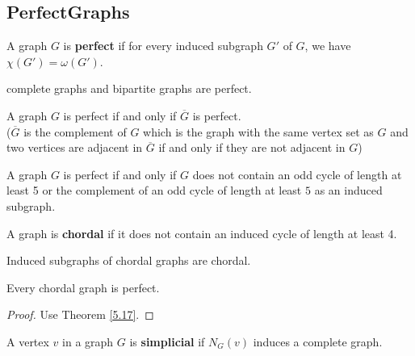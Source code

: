 \subsection{PerfectGraphs}
\begin{definition}\label{5.15}
    A graph $G$ is \textbf{perfect} if for every induced subgraph $G'$ of $G$, we have $\chi(G')=\omega(G')$.
\end{definition}
\begin{example}\label{5.16}
    complete graphs and bipartite graphs are perfect.
\end{example}
\begin{theorem}\label{5.17}
    A graph $G$ is perfect if and only if $\overline{G}$ is perfect.\\
    ($\overline{G}$ is the complement of $G$ which is the graph with the same vertex set as $G$ and two vertices are adjacent in $\overline{G}$ if and only if they are not adjacent in $G$)
\end{theorem}
\begin{theorem}\label{5.18}
    A graph $G$ is perfect if and only if $G$ does not contain an odd cycle of length at least 5 or the complement of an odd cycle of length at least $5$ as an induced subgraph.
\end{theorem}
\begin{definition}\label{5.19}
    A graph is \textbf{chordal} if it does not contain an induced cycle of length at least 4.
\end{definition}
\begin{remark}\label{5.20}
    Induced subgraphs of chordal graphs are chordal.
\end{remark}
\begin{theorem}\label{5.21}
    Every chordal graph is perfect.
\end{theorem}
\begin{proof}
    Use Theorem \ref{5.17}.
\end{proof}
\begin{definition}\label{5.22}
    A vertex $v$ in a graph $G$ is \textbf{simplicial} if $N_G(v)$ induces a complete graph.

\begin{center}
\end{center}
\end{definition}
